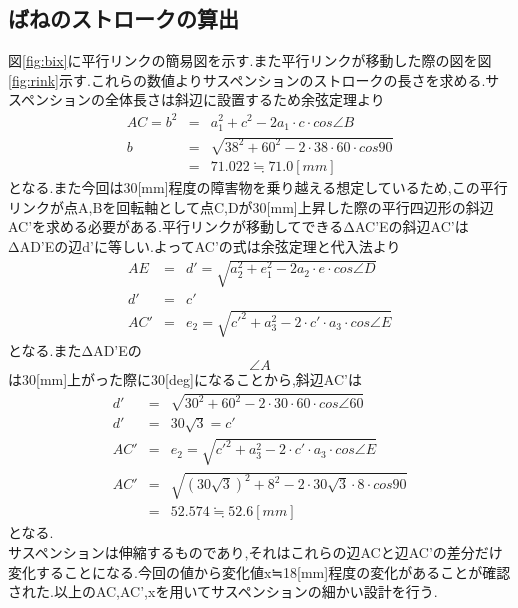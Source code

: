 \documentclass[12pt,oneside]{sotsuken_paper}
\begin{document}
\subsection{ばねのストロークの算出} 
図\ref{fig:bix}に平行リンクの簡易図を示す.また平行リンクが移動した際の図を図\ref{fig:rink}示す.これらの数値よりサスペンションのストロークの長さを求める.サスペンションの全体長さは斜辺に設置するため余弦定理より 
\begin{eqnarray} 
   AC = b^2 & = & a_1^2+c^2-2a_1\cdot c\cdot cos\angle B \\ 
  b & = & \sqrt{38^2+60^2-2\cdot 38\cdot 60\cdot cos90} \\ 
    & = &71.022 ≒　71.0[mm] 
\end{eqnarray} 
となる.また今回は30[mm]程度の障害物を乗り越える想定しているため,この平行リンクが点A,Bを回転軸として点C,Dが30[mm]上昇した際の平行四辺形の斜辺AC'を求める必要がある.平行リンクが移動してできるΔAC'Eの斜辺AC'はΔAD'Eの辺d'に等しい.よってAC'の式は余弦定理と代入法より 
\begin{eqnarray} 
	AE& = &d' =  \sqrt{a_2^2+e_1^2-2a_2\cdot e\cdot cos\angle D} \\ 
	d' & = & c' \\ 
	AC'&= &e_2  =  \sqrt{c'^2+a_3^2-2\cdot c'\cdot a_3\cdot cos\angle E} 
\end{eqnarray} 
となる.またΔAD'Eの\[\angle A\]は30[mm]上がった際に30[deg]になることから,斜辺AC'は 
\begin{eqnarray} 
	d' &=& \sqrt{30^2+60^2-2\cdot 30\cdot 60\cdot cos\angle 60} \\ 
	d'&=&30\sqrt{3}=c' \\ 
	AC'&= &e_2  =  \sqrt{c'^2+a_3^2-2\cdot c'\cdot a_3\cdot cos\angle E}  \\ 
	AC' &=& \sqrt{(30\sqrt{3})^2+8^2-2\cdot 30\sqrt{3}\cdot 8\cdot cos90} \\ 
	& = & 52.574 ≒ 52.6 [mm] 
\end{eqnarray} 
となる.　\\ 
サスペンションは伸縮するものであり,それはこれらの辺ACと辺AC'の差分だけ変化することになる.今回の値から変化値x≒18[mm]程度の変化があることが確認された.以上のAC,AC',xを用いてサスペンションの細かい設計を行う. 
\end{document}
